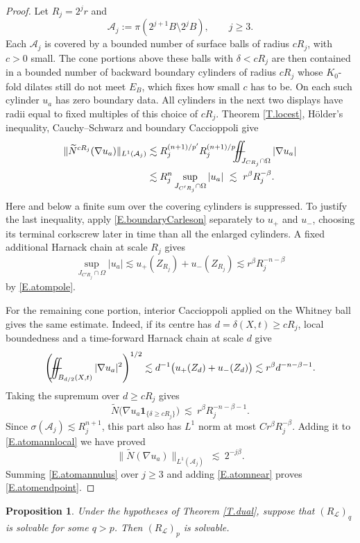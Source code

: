 \documentclass[12pt,leqno]{amsart}
\numberwithin{equation}{section}
\newcommand{\om}{\Omega}
\newcommand{\LL}{\mathcal L}
\newcommand{\Nt}{\widetilde N}
\def\Yint#1{\mathchoice
	{\YYint\displaystyle\textstyle{#1}}%
	{\YYint\textstyle\scriptstyle{#1}}%
	{\YYint\scriptstyle\scriptscriptstyle{#1}}%
	{\YYint\scriptscriptstyle\scriptscriptstyle{#1}}%
	\!\dint}
\newcommand{\dint}{\int\!\!\!\!\!\int}
\def\YYint#1#2#3{{\setbox0=\hbox{$#1{#2#3}{\iint}$}
		\vcenter{\hbox{$#2#3$}}\kern-.51\wd0}}
\def\longdash{\mkern-1.5mu{-}\mkern-7.5mu{-}}
\def\fiint{\Yint\longdash}
\theoremstyle{plain}
\newtheorem{proposition}[equation]{Proposition}
\theoremstyle{remark}
\begin{document}
\begin{proof}
Let $R_j=2^jr$ and
\[
 \mathcal A_j:=\pi(2^{j+1}B\setminus2^jB),\qquad j\ge3.
\]
Each $\mathcal A_j$ is covered by a bounded number of surface balls of radius
$cR_j$, with $c>0$ small. The cone portions above these balls with
$\delta<cR_j$ are then contained in a bounded number of backward boundary
cylinders of radius $cR_j$ whose $K_0$-fold dilates still do not meet
$E_B$, which fixes how small $c$ has to be. On each such cylinder $u_a$ has
zero boundary data. All cylinders in the next two displays have radii equal
to fixed multiples of this choice of $cR_j$. Theorem \ref{T.locest},
H\"older's inequality, Cauchy--Schwarz and boundary Caccioppoli give
\begin{align}
 \|\Nt^{cR_j}(\nabla u_a)\|_{L^1(\mathcal A_j)}
 &\lesssim R_j^{(n+1)/p'}R_j^{(n+1)/p}
       \fiint_{J_{CR_j}\cap\om}|\nabla u_a|\notag\\
 &\lesssim R_j^n\sup_{J_{C'R_j}\cap\om}|u_a|
 \ \lesssim\ r^\beta R_j^{-\beta}.
 \label{E.atomannlocal}
\end{align}
Here and below a finite sum over the covering cylinders is suppressed. To
justify the last inequality, apply \eqref{E.boundaryCarleson} separately to
$u_+$ and $u_-$, choosing its terminal corkscrew later in time than all the
enlarged cylinders. A fixed additional Harnack chain at scale $R_j$ gives
\[
 \sup_{J_{C'R_j}\cap\om}|u_a|
 \lesssim u_+(Z_{R_j})+u_-(Z_{R_j})
 \lesssim r^\beta R_j^{-n-\beta}
\]
by \eqref{E.atompole}.

For the remaining cone portion, interior Caccioppoli applied on the Whitney
ball gives the same estimate. Indeed, if its centre has
$d=\delta(X,t)\ge cR_j$, local boundedness and a time-forward Harnack chain at
scale $d$ give
\[
 \left(\fiint_{B_{d/2}(X,t)}|\nabla u_a|^2\right)^{1/2}
 \lesssim d^{-1}\big(u_+(Z_d)+u_-(Z_d)\big)
 \lesssim r^\beta d^{-n-\beta-1}.
\]
Taking the supremum over $d\ge cR_j$ gives
\[
 \Nt\big(\nabla u_a\mathbf1_{\{\delta\ge cR_j\}}\big)
 \ \lesssim\ r^\beta R_j^{-n-\beta-1}.
\]
Since $\sigma(\mathcal A_j)\lesssim R_j^{n+1}$, this part also has $L^1$ norm
at most $Cr^\beta R_j^{-\beta}$. Adding it to \eqref{E.atomannlocal} we have
proved
\begin{equation}\label{E.atomannulus}
 \|\Nt(\nabla u_a)\|_{L^1(\mathcal A_j)}\ \lesssim\ 2^{-j\beta}.
\end{equation}
Summing \eqref{E.atomannulus} over $j\ge3$ and adding \eqref{E.atomnear}
proves \eqref{E.atomendpoint}.
\end{proof}

\begin{proposition}\label{P.dualqabove}
Under the hypotheses of Theorem \ref{T.dual}, suppose that $(R_{\LL})_q$ is
solvable for some $q>p$. Then $(R_{\LL})_p$ is solvable.
\end{proposition}
\end{document}
